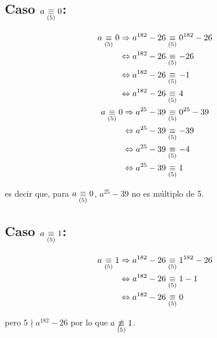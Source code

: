 \documentclass[a4paper,spanish]{article}
\begin{document}
  \subsection*{Caso $a \underset{(5)}\equiv 0$:}
  \begin{align*}
    a \underset{(5)}\equiv 0 \Rightarrow a^{182} - 26 &\underset{(5)}\equiv 0^{182} - 26              \\
                   \Leftrightarrow  a^{182} - 26 &\underset{(5)}\equiv -26                       \\
                   \Leftrightarrow  a^{182} - 26 &\underset{(5)}\equiv -1                        \\
                   \Leftrightarrow  a^{182} - 26 &\underset{(5)}\equiv 4                         \\
    a \underset{(5)}\equiv 0 \Rightarrow a^{25} - 39  &\underset{(5)}\equiv 0^{25} - 39               \\
                   \Leftrightarrow  a^{25} - 39  &\underset{(5)}\equiv -39                       \\
                   \Leftrightarrow  a^{25} - 39  &\underset{(5)}\equiv -4                        \\
                   \Leftrightarrow  a^{25} - 39  &\underset{(5)}\equiv 1
  \end{align*}

  es decir que, para $a \underset{(5)}\equiv 0$, $a^{25} - 39$ no es múltiplo de 5.

  \subsection*{Caso $a \underset{(5)}\equiv 1$:}
  \begin{align*}
    a \underset{(5)}\equiv 1 \Rightarrow a^{182} - 26 &\underset{(5)}\equiv 1^{182} - 26              \\
                   \Leftrightarrow  a^{182} - 26 &\underset{(5)}\equiv 1       - 1               \\
                   \Leftrightarrow  a^{182} - 26 &\underset{(5)}\equiv 0
  \end{align*}

  pero $5 \nmid a^{182} - 26$ por lo que $a \not\underset{(5)}\equiv 1$.
\end{document}
